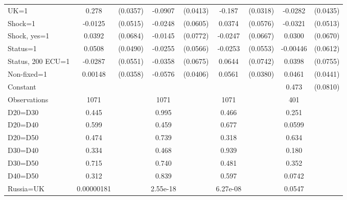 \begin{tabular}{l|cccccc|cc}
UK=1            &    0.278\sym{***}& (0.0357)&  -0.0907\sym{**} & (0.0413)&   -0.187\sym{***}& (0.0318)&  -0.0282         & (0.0435)\\
Shock=1         &  -0.0125         & (0.0515)&  -0.0248         & (0.0605)&   0.0374         & (0.0576)&  -0.0321         & (0.0513)\\
Shock, yes=1    &   0.0392         & (0.0684)&  -0.0145         & (0.0772)&  -0.0247         & (0.0667)&   0.0300         & (0.0670)\\
Status=1        &   0.0508         & (0.0490)&  -0.0255         & (0.0566)&  -0.0253         & (0.0553)& -0.00446         & (0.0612)\\
Status, 200 ECU=1&  -0.0287         & (0.0551)&  -0.0358         & (0.0675)&   0.0644         & (0.0742)&   0.0398         & (0.0755)\\
Non-fixed=1     &  0.00148         & (0.0358)&  -0.0576         & (0.0406)&   0.0561         & (0.0380)&   0.0461         & (0.0441)\\
Constant        &                  &         &                  &         &                  &         &    0.473\sym{***}& (0.0810)\\
\hline
Observations    &     1071         &         &     1071         &         &     1071         &         &      401         &         \\
D20=D30         &    0.445         &         &    0.995         &         &    0.466         &         &    0.251         &         \\
D20=D40         &    0.599         &         &    0.459         &         &    0.677         &         &   0.0599         &         \\
D20=D50         &    0.474         &         &    0.739         &         &    0.318         &         &    0.634         &         \\
D30=D40         &    0.334         &         &    0.468         &         &    0.939         &         &    0.180         &         \\
D30=D50         &    0.715         &         &    0.740         &         &    0.481         &         &    0.352         &         \\
D40=D50         &    0.312         &         &    0.839         &         &    0.597         &         &   0.0742         &         \\
Russia=UK       &0.00000181         &         & 2.55e-18         &         & 6.27e-08         &         &   0.0547         &         \\

\end{tabular}
